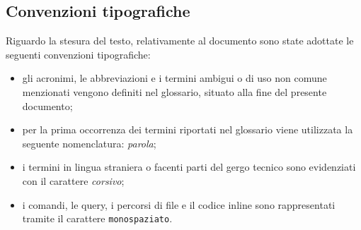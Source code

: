 \subsection{Convenzioni tipografiche}
Riguardo la stesura del testo, relativamente al documento sono state adottate le seguenti convenzioni tipografiche:
\begin{itemize}
	\item gli acronimi, le abbreviazioni e i termini ambigui o di uso non comune menzionati vengono definiti nel glossario, situato alla fine del presente documento;
	\item per la prima occorrenza dei termini riportati nel glossario viene utilizzata la seguente nomenclatura: \emph{parola}\glsfirstoccur;
	\item i termini in lingua straniera o facenti parti del gergo tecnico sono evidenziati con il carattere \emph{corsivo};
	\item i comandi, le query, i percorsi di file e il codice inline sono rappresentati tramite il carattere \texttt{monospaziato}.
\end{itemize}
